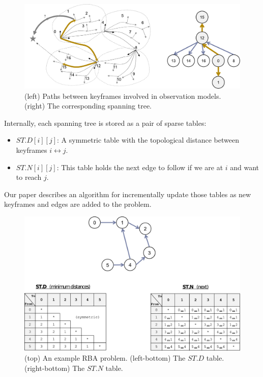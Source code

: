 \documentclass[a4paper,11pt]{article}
\begin{document}
\begin{figure}[h]
\centering
\includegraphics[width=1.0\textwidth]{imgs/spanning-tree-motivation1.pdf} 
\caption{(left) Paths between keyframes involved in observation models. (right) The corresponding spanning tree.}
\label{fig:STs1}
\end{figure}

Internally, each spanning tree is stored as a pair of sparse tables:
\begin{itemize}
 \item $ST.D[i][j]$: A symmetric table with the topological distance between keyframes $i \leftrightarrow j$.
 \item $ST.N[i][j]$: This table holds the next edge to follow if we are at $i$ and want to reach $j$. 
\end{itemize}

Our paper \cite{blanco2013srba} describes an algorithm for incrementally update those tables as new keyframes and edges
are added to the problem.

\begin{figure}[h!]
\centering
\includegraphics[width=1.0\textwidth]{imgs/spanning-tree-tables.pdf} 
\caption{(top) An example RBA problem. (left-bottom) The $ST.D$ table. (right-bottom) The $ST.N$ table.}
\label{fig:STs2}
\end{figure}
\end{document}
